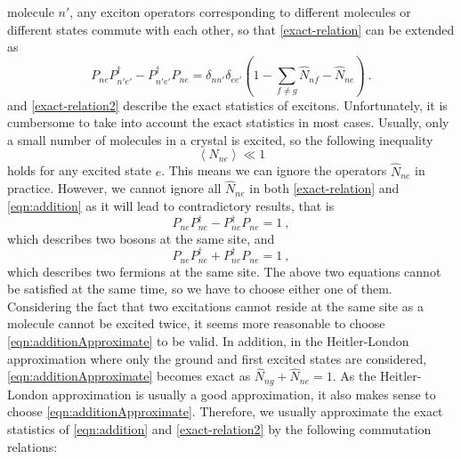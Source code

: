 molecule $n'$, any exciton operators corresponding to different molecules or different states
commute with each other, so that \autoref{exact-relation} can be extended as 
\begin{equation}
P_{ne}P_{n'e'}^{\dagger}-P_{n' e'}^{\dagger}P_{n e}  =  \delta_{nn'}\delta_{ee'}\left(1-\sum_{f\neq g}\hat{N}_{nf} -\hat{N}_{ne} \right)  \ . \label{exact-relation2}
\end{equation}
 and \autoref{exact-relation2} describe the exact
statistics of excitons.  Unfortunately, it is cumbersome to take into account  the exact
statistics in most cases. Usually, only a small number of molecules in a crystal is excited, so the following inequality
\begin{equation}
\left\langle N_{ne} \right\rangle \ll 1 \label{condition-for-Bose-approx}
\end{equation}
holds for any excited state $e$. This means we can ignore the operators $\hat{N}_{ne}$ in practice. However, we cannot
ignore all $\hat{N}_{ne}$ in both \autoref{exact-relation} and \autoref{eqn:addition} as it will lead to contradictory 
results, that is  
\begin{equation}
P_{ne} P_{ne}^{\dagger} - P_{ne}^{\dagger} P_{ne} = 1\ , \label{eqn:subtractionApproximate}
\end{equation}
which describes two bosons at the same site, 
and 
\begin{equation}
P_{ne} P_{ne}^{\dagger} + P_{ne}^{\dagger} P_{ne} = 1 \ , \label{eqn:additionApproximate}
\end{equation}
which describes two fermions at the same site. 
The above two equations cannot be satisfied at the same time, so we have to choose either one of them. Considering the 
fact that two excitations cannot reside at the same site as a molecule cannot be excited twice, 
it seems more reasonable to choose \autoref{eqn:additionApproximate} to be valid. In addition, 
in the Heitler-London approximation where only the ground and first excited states are considered, 
\autoref{eqn:additionApproximate} becomes exact as $ \hat{N}_{ng}  + \hat{N}_{ne}=1$. As the Heitler-London 
approximation is usually a good approximation, it also makes sense to choose \autoref{eqn:additionApproximate}. 
Therefore, we usually approximate the exact statistics of \autoref{eqn:addition} and \autoref{exact-relation2} by  the following commutation relations: 
